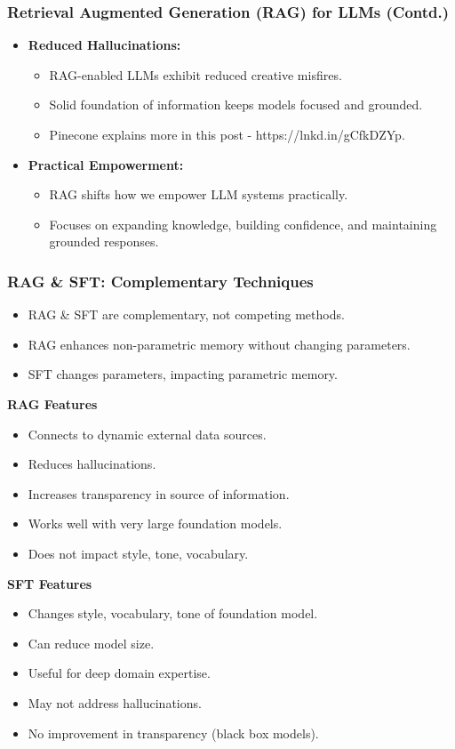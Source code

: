 \begin{frame}[fragile]\frametitle{Retrieval Augmented Generation (RAG) for LLMs (Contd.)}

\begin{itemize}
  \item \textbf{Reduced Hallucinations:}
    \begin{itemize}
      \item RAG-enabled LLMs exhibit reduced creative misfires.
      \item Solid foundation of information keeps models focused and grounded.
      \item Pinecone explains more in this post - https://lnkd.in/gCfkDZYp.
    \end{itemize}

  \item \textbf{Practical Empowerment:}
    \begin{itemize}
      \item RAG shifts how we empower LLM systems practically.
      \item Focuses on expanding knowledge, building confidence, and maintaining grounded responses.
    \end{itemize}
\end{itemize}

\end{frame}


\begin{frame}[fragile]\frametitle{RAG \& SFT: Complementary Techniques}
\begin{itemize}
  \item RAG \& SFT are complementary, not competing methods.
  \item RAG enhances non-parametric memory without changing parameters.
  \item SFT changes parameters, impacting parametric memory.
\end{itemize}
\textbf{RAG Features}
\begin{itemize}
  \item Connects to dynamic external data sources.
  \item Reduces hallucinations.
  \item Increases transparency in source of information.
  \item Works well with very large foundation models.
  \item Does not impact style, tone, vocabulary.
\end{itemize}
\textbf{SFT Features}
\begin{itemize}
  \item Changes style, vocabulary, tone of foundation model.
  \item Can reduce model size.
  \item Useful for deep domain expertise.
  \item May not address hallucinations.
  \item No improvement in transparency (black box models).
\end{itemize}
\end{frame}

